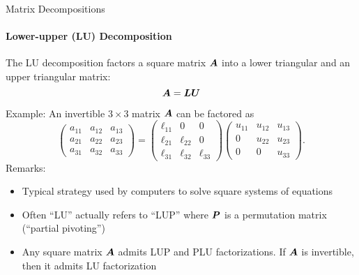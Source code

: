 \begin{frame}{Matrix Decompositions}
    \framesubtitle{Lower-upper (LU) Decomposition}

    \begin{boxed}
        The LU decomposition factors a square matrix $\bm{A}$ into a lower triangular and an upper triangular matrix:
        $$\bm{A} = \bm{L} \bm{U}$$
    \end{boxed}

    Example: An invertible $3 \times 3$ matrix $\bm{A}$ can be factored as
    $$
        \begin{pmatrix}
            a_{11} & a_{12} & a_{13} \\
            a_{21} & a_{22} & a_{23} \\
            a_{31} & a_{32} & a_{33}
        \end{pmatrix} =
        \begin{pmatrix}
            \ell_{11} & 0         & 0         \\
            \ell_{21} & \ell_{22} & 0         \\
            \ell_{31} & \ell_{32} & \ell_{33}
        \end{pmatrix}
        \begin{pmatrix}
            u_{11} & u_{12} & u_{13} \\
            0      & u_{22} & u_{23} \\
            0      & 0      & u_{33}
        \end{pmatrix}.
    $$
    Remarks:
    \begin{itemize}
        \item Typical strategy used by computers to solve square systems of equations
        \item Often ``LU'' actually refers to  ``LUP'' where $\bm{P}$ is a permutation matrix (``partial pivoting'')
        \item Any square matrix $\bm{A}$ admits LUP and PLU factorizations. If $\bm{A}$ is invertible, then it admits LU factorization
    \end{itemize}
\end{frame}

